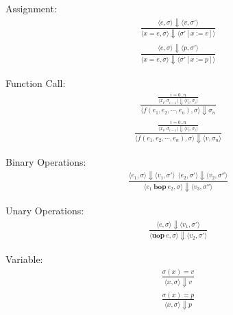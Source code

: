 \documentclass[12pt]{article}
\begin{document}
	Assignment:
	\begin{align*}
		\frac{\langle e, \sigma \rangle\Downarrow \langle v, \sigma' \rangle}
		{\langle x = e, \sigma \rangle\Downarrow \langle \sigma' [x := v] \rangle}
	\end{align*}
	\begin{align*}
		\frac{\langle e, \sigma \rangle\Downarrow \langle p, \sigma' \rangle}
		{\langle x = e, \sigma \rangle\Downarrow \langle \sigma' [x := p] \rangle}
	\end{align*}

	Function Call:
	\begin{align*}
		\frac{
			\frac{i = 0..n}
			{\langle x_i, \sigma_{i-1} \rangle\Downarrow \langle v_i, \sigma_i \rangle}
		}
		{\langle f(e_1, e_2, \cdots, e_n), \sigma \rangle\Downarrow \sigma_n}
	\end{align*}
	\begin{align*}
		\frac{
			\frac{i = 0..n}
			{\langle x_i, \sigma_{i-1} \rangle\Downarrow \langle v_i, \sigma_i \rangle}
		}
		{\langle f(e_1, e_2, \cdots, e_n), \sigma \rangle\Downarrow \langle v, \sigma_n \rangle}
	\end{align*}


	Binary Operations:
	\begin{align*}
		\frac{\langle e_1, \sigma \rangle\Downarrow \langle v_1, \sigma' \rangle \ \
		\langle e_2, \sigma' \rangle\Downarrow \langle v_2, \sigma'' \rangle}
		{\langle e_1\ \textbf{bop}\ e_2, \sigma \rangle\Downarrow \langle v_3, \sigma'' \rangle}
	\end{align*}
	
	Unary Operations:
	\begin{align*}
		\frac{\langle e, \sigma \rangle\Downarrow \langle v_1, \sigma' \rangle}
		{\langle \textbf{uop}\ e, \sigma \rangle\Downarrow \langle v_2, \sigma' \rangle}
	\end{align*}

	Variable:
	\begin{align*}
		\frac{\sigma(x) = v}
		{\langle x, \sigma \rangle\Downarrow v}
	\end{align*}
	\begin{align*}
		\frac{\sigma(x) = p}
		{\langle x, \sigma \rangle\Downarrow p}
	\end{align*}
\end{document}
